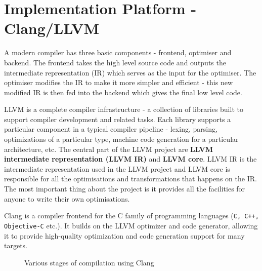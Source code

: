 \chapter{Implementation Platform - Clang/LLVM}
\label{chap:chapter6}

A modern compiler has three basic components - frontend, optimiser and backend.
The frontend takes the high level source code and outputs the intermediate 
representation (IR) which serves as the input for the optimiser. The optimiser 
modifies the IR to make it more simpler and efficient - this new modified IR is 
then fed into the backend which gives the final low level code.

LLVM is a complete compiler infrastructure - a collection of libraries built to 
support compiler development and related tasks. Each library supports a particular 
component in a typical compiler pipeline - lexing, parsing, optimizations of a 
particular type, machine code generation for a particular architecture, etc. The 
central part of the LLVM project are \textbf{LLVM intermediate representation 
(LLVM IR)} and \textbf{LLVM core}. LLVM IR is the intermediate representation 
used in the LLVM project and LLVM core is responsible for all the optimisations
and transformations that happens on the IR. The most important thing about the 
project is it provides all the facilities for anyone to write their own 
optimisations.

Clang is a compiler frontend for the C family of programming languages 
(\texttt{C, C++, Objective-C} etc.). It builds on the LLVM optimizer and code 
generator, allowing it to provide high-quality optimization and code generation 
support for many targets.

\begin{figure}[!t]
    \caption{Various stages of compilation using Clang}
    \label{fig:LLVMcompiler}
\end{figure}

